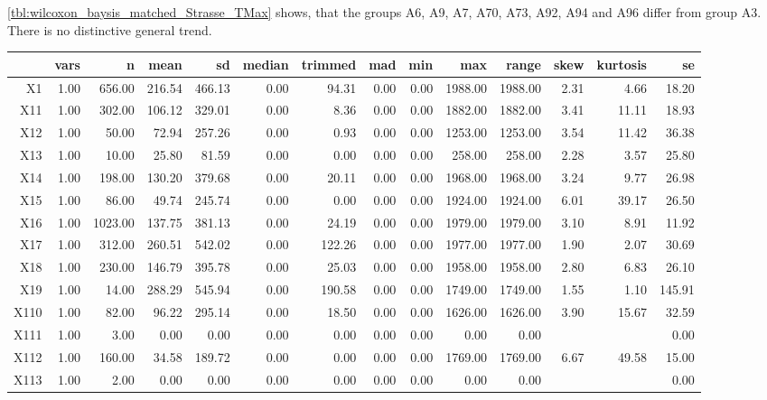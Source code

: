 \cref{tbl:wilcoxon_baysis_matched_Strasse_TMax} shows, that the groups A6, A9, A7, A70, A73, A92, A94 and A96 differ from group A3. There is no distinctive general trend.
\begin{table}[ht!]
	\tiny
	\centering
  \begin{tabular}{rrrrrrrrrrrrrr}
    \hline
   & vars & n & mean & sd & median & trimmed & mad & min & max & range & skew & kurtosis & se \\ 
    \hline
  X1 & 1.00 & 656.00 & 216.54 & 466.13 & 0.00 & 94.31 & 0.00 & 0.00 & 1988.00 & 1988.00 & 2.31 & 4.66 & 18.20 \\ 
    X11 & 1.00 & 302.00 & 106.12 & 329.01 & 0.00 & 8.36 & 0.00 & 0.00 & 1882.00 & 1882.00 & 3.41 & 11.11 & 18.93 \\ 
    X12 & 1.00 & 50.00 & 72.94 & 257.26 & 0.00 & 0.93 & 0.00 & 0.00 & 1253.00 & 1253.00 & 3.54 & 11.42 & 36.38 \\ 
    X13 & 1.00 & 10.00 & 25.80 & 81.59 & 0.00 & 0.00 & 0.00 & 0.00 & 258.00 & 258.00 & 2.28 & 3.57 & 25.80 \\ 
    X14 & 1.00 & 198.00 & 130.20 & 379.68 & 0.00 & 20.11 & 0.00 & 0.00 & 1968.00 & 1968.00 & 3.24 & 9.77 & 26.98 \\ 
    X15 & 1.00 & 86.00 & 49.74 & 245.74 & 0.00 & 0.00 & 0.00 & 0.00 & 1924.00 & 1924.00 & 6.01 & 39.17 & 26.50 \\ 
    X16 & 1.00 & 1023.00 & 137.75 & 381.13 & 0.00 & 24.19 & 0.00 & 0.00 & 1979.00 & 1979.00 & 3.10 & 8.91 & 11.92 \\ 
    X17 & 1.00 & 312.00 & 260.51 & 542.02 & 0.00 & 122.26 & 0.00 & 0.00 & 1977.00 & 1977.00 & 1.90 & 2.07 & 30.69 \\ 
    X18 & 1.00 & 230.00 & 146.79 & 395.78 & 0.00 & 25.03 & 0.00 & 0.00 & 1958.00 & 1958.00 & 2.80 & 6.83 & 26.10 \\ 
    X19 & 1.00 & 14.00 & 288.29 & 545.94 & 0.00 & 190.58 & 0.00 & 0.00 & 1749.00 & 1749.00 & 1.55 & 1.10 & 145.91 \\ 
    X110 & 1.00 & 82.00 & 96.22 & 295.14 & 0.00 & 18.50 & 0.00 & 0.00 & 1626.00 & 1626.00 & 3.90 & 15.67 & 32.59 \\ 
    X111 & 1.00 & 3.00 & 0.00 & 0.00 & 0.00 & 0.00 & 0.00 & 0.00 & 0.00 & 0.00 &  &  & 0.00 \\ 
    X112 & 1.00 & 160.00 & 34.58 & 189.72 & 0.00 & 0.00 & 0.00 & 0.00 & 1769.00 & 1769.00 & 6.67 & 49.58 & 15.00 \\ 
    X113 & 1.00 & 2.00 & 0.00 & 0.00 & 0.00 & 0.00 & 0.00 & 0.00 & 0.00 & 0.00 &  &  & 0.00 \\ 

\end{tabular}
\end{table}
